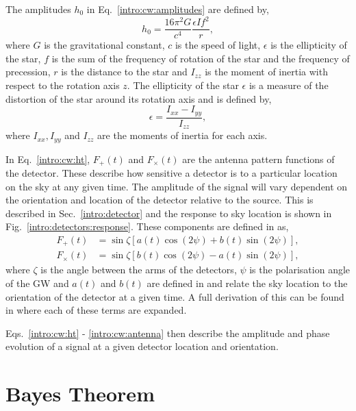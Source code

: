 The amplitudes $h_0$ in Eq.~\ref{intro:cw:amplitudes} are defined by,
\begin{equation}
    h_0 = \frac{16 \pi^2 G}{c^4} \frac{\epsilon I f^2}{r},
\end{equation}
where $G$ is the gravitational constant, $c$ is the speed of light, $\epsilon$ is the ellipticity of the star, $f$ is the sum of the frequency of rotation of the star and the frequency of precession, $r$ is the distance to the star and $I_{zz}$ is the moment of inertia with respect to the rotation axis $z$.
The ellipticity of the star $\epsilon$ is a measure of the distortion of the star around its rotation axis and is defined by,
\begin{equation}
    \epsilon = \frac{I_{xx} - I_{yy}}{I_{zz}},
\end{equation}
where $I_{xx}, I_{yy}$ and $I_{zz}$ are the moments of inertia for each axis.

In Eq.~\ref{intro:cw:ht}, $F_+(t)$ and $F_{\times}(t)$ are the antenna pattern functions of the detector. 
These describe how sensitive a detector is to a particular location on the sky at any given time. 
The amplitude of the signal will vary dependent on the orientation and location of the detector relative to the source.
This is described in Sec.~\ref{intro:detector} and the response to sky location is shown in Fig.~\ref{intro:detectors:response}.
These components are defined in \citep{schutz1998DataAnalysis} as,
\begin{equation}
\label{intro:cw:antenna}
\begin{split}
F_{+}(t) &= \sin{\zeta}[a(t)\cos{(2\psi)} + b(t)\sin{(2\psi)}], \\
F_{\times}(t) &= \sin{\zeta}[b(t) \cos{(2\psi)} - a(t)\sin{(2\psi)}],
\end{split}
\end{equation}
where $\zeta$ is the angle between the arms of the detectors, $\psi$ is the polarisation angle of the \gls{GW} and $a(t)$ and $b(t)$ are defined in \citep{schutz1998DataAnalysis} and relate the sky location to the orientation of the detector at a given time. 
A full derivation of this can be found in \citep{schutz1998DataAnalysis} where each of these terms are expanded.

Eqs.~\ref{intro:cw:ht} - \ref{intro:cw:antenna} then describe the amplitude and phase evolution of a signal at a given detector location and orientation.



\section{\label{intro:prob} Bayes Theorem}

